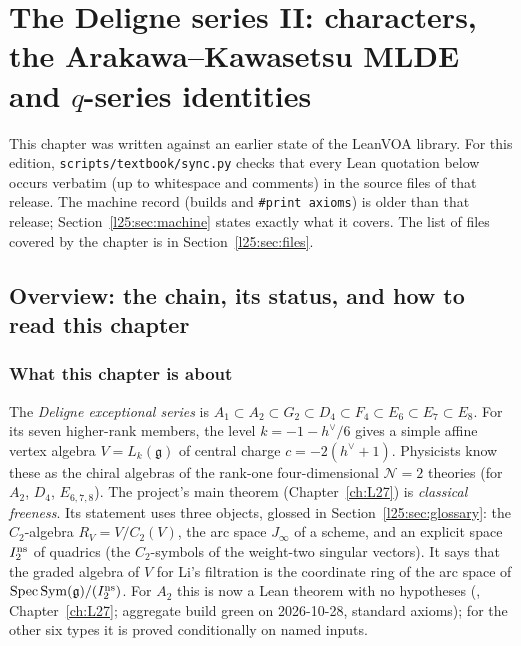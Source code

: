 \chapter{The Deligne series II: characters, the Arakawa--Kawasetsu MLDE and \texorpdfstring{$q$}{q}-series identities}\label{ch:L25}
\begingroup\setlength{\emergencystretch}{3em}\sloppy

\providecommand{\ltwentyfiveg}{\mathfrak g}
\providecommand{\ltwentyfivevac}{|0\rangle}
\providecommand{\ltwentyfiveD}{\mathcal D}
\providecommand{\ltwentyfivehv}{h^{\vee}}
\providecommand{\ltwentyfiveEu}{\delta_q}

This chapter was written against an earlier state of the LeanVOA library. For this edition, \texttt{scripts/textbook/sync.py} checks that every Lean quotation below occurs verbatim (up to whitespace and comments) in the source files of that release. The machine
record (builds and \texttt{\#print axioms}) is older than that release; Section~\ref{l25:sec:machine} states exactly
what it covers. The list of files covered by the chapter is in Section~\ref{l25:sec:files}.

\section{Overview: the chain, its status, and how to read this chapter}\label{l25:sec:overview}

\subsection{What this chapter is about}

The \emph{Deligne exceptional series} is
$A_1\subset A_2\subset G_2\subset D_4\subset F_4\subset E_6\subset E_7\subset E_8$. For its seven higher-rank
members, the level $k=-1-\ltwentyfivehv/6$ gives a simple affine vertex algebra $V=L_k(\ltwentyfiveg)$ of central
charge $c=-2(\ltwentyfivehv+1)$. Physicists know these as the chiral algebras of the rank-one four-dimensional
$\mathcal N=2$ theories (for $A_2$, $D_4$, $E_{6,7,8}$). The project's main theorem (Chapter~\ref{ch:L27}) is
\emph{classical freeness}. Its statement uses three objects, glossed in Section~\ref{l25:sec:glossary}: the
$C_2$-algebra $R_V=V/C_2(V)$, the arc space $J_\infty$ of a scheme, and an explicit space $I_2^{\rm ns}$ of
quadrics (the $C_2$-symbols of the weight-two singular vectors). It says that the graded algebra of $V$ for Li's
filtration is the coordinate ring of the arc space of $\operatorname{Spec}\operatorname{Sym}(\ltwentyfiveg)/(I_2^{\rm ns})$.
For $A_2$ this is now a Lean theorem with no hypotheses (,
Chapter~\ref{ch:L27}; aggregate build green on 2026-10-28, standard axioms); for the other six types it is proved conditionally on named inputs.

